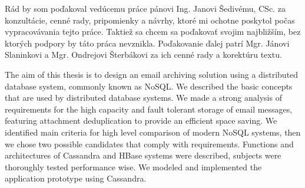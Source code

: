\documentclass[11pt,twoside,a4paper]{book}
\begin{document}

\coverpagestarts


\acknowledgements
\noindent
Rád by som poďakoval vedúcemu práce pánovi Ing. Janovi Šedivému, CSc. za konzultácie, cenné rady, pripomienky a návrhy, ktoré mi ochotne poskytol počas vypracovávania tejto práce.
Taktiež sa chcem sa poďakovať svojim najbližším, bez ktorých podpory by táto práca nevznikla. Poďakovanie ďalej patrí Mgr. Jánovi Slaninkovi a Mgr. Ondrejovi Šterbákovi za ich cenné rady a korektúru textu.





 
\abstractpage


The aim of this thesis is to design an email archiving solution using a distributed database system, commonly known as NoSQL. We described the basic concepts that are used by distributed database systems. We made a strong analysis of requirements for the high capacity and fault tolerant storage of email messages, featuring attachment deduplication to provide an efficient space saving. We identified main criteria for high level comparison of modern NoSQL systems, then we chose two possible candidates that comply with requirements. Functions and architectures of Cassandra and HBase systems were described, subjects were thoroughly tested performance wise. We modeled and implemented the application prototype using Cassandra.
\end{document}

